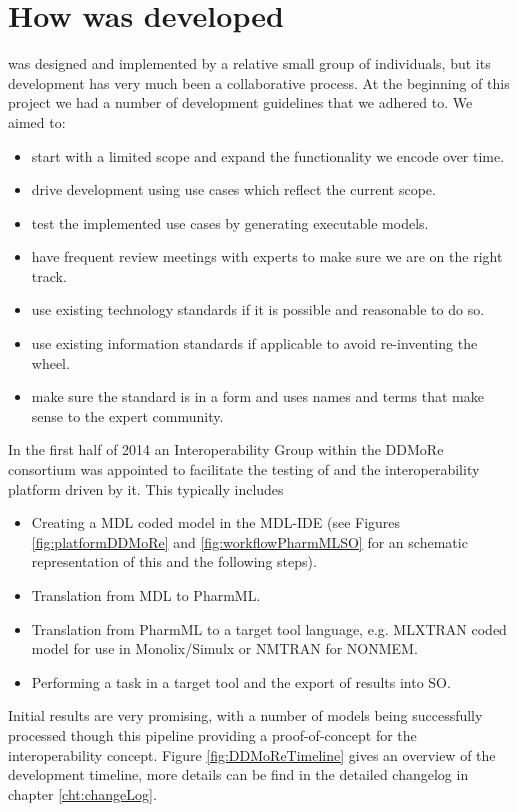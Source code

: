 \section{How \pharmml was developed}

\pharmml was designed and implemented by a relative small group of individuals, 
but its development has very much been a collaborative process. At the beginning of 
this project we had a number of development guidelines that we adhered to. We aimed to:


\begin{itemize}
\item start with a limited scope and expand the functionality we encode over time.
\item drive development using use cases which reflect the current scope.
\item test the implemented use cases by generating executable models.
\item have frequent review meetings with experts to make sure we are on the right track.
\item use existing technology standards if it is possible and reasonable to do so.
\item use existing information standards if applicable to avoid re-inventing the wheel.
\item make sure the standard is in a form and uses names and terms that make sense to the expert community.
\end{itemize}

In the first half of 2014 an Interoperability Group within the DDMoRe consortium 
was appointed to facilitate the testing of \pml and the interoperability platform driven 
by it. This typically includes 
\begin{itemize}
\item
Creating a MDL coded model in the MDL-IDE (see Figures \ref{fig:platformDDMoRe} 
and \ref{fig:workflowPharmMLSO} for an schematic representation of this and 
the following steps).
\item
Translation from MDL to PharmML.
\item
Translation from PharmML to a target tool language, e.g. MLXTRAN coded model 
for use in Monolix/Simulx or NMTRAN for NONMEM.
\item
Performing a task in a target tool and the export of results into SO.
\end{itemize}
Initial results are very promising, with a number of models being successfully processed 
though this pipeline providing a proof-of-concept for the interoperability concept. 
Figure \ref{fig:DDMoReTimeline} gives an overview of the development timeline, 
more details can be find in the detailed changelog in chapter \ref{cht:changeLog}.

